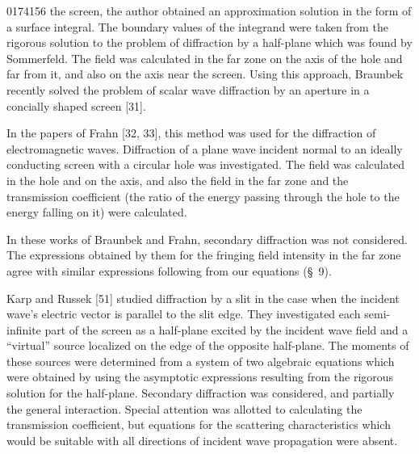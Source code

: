 \begin{scanpage}{0174}{156}
the screen, the author obtained an approximation solution in the form of a surface integral. The boundary values of the integrand were taken from the rigorous solution to the problem of diffraction by a half-plane which was found by Sommerfeld. The field was calculated in the far zone on the axis of the hole and far from it, and also on the axis near the screen. Using this approach, Braunbek recently solved the problem of scalar wave diffraction by an aperture in a concially shaped screen [31].

In the papers of Frahn [32, 33], this method was used for the diffraction of electromagnetic waves. Diffraction of a plane wave incident normal to an ideally conducting screen with a circular hole was investigated. The field was calculated in the hole and on the axis, and also the field in the far zone and the transmission coefficient (the ratio of the energy passing through the hole to the energy falling on it) were calculated.

In these works of Braunbek and Frahn, secondary diffraction was not considered. The expressions obtained by them for the fringing field intensity in the far zone agree with similar expressions following from our equations (\S~9).

Karp and Russek [51] studied diffraction by a slit in the case when the incident wave's electric vector is parallel to the slit edge. They investigated each semi-infinite part of the screen as a half-plane excited by the incident wave field and a ``virtual'' source localized on the edge of the opposite half-plane. The moments of these sources were determined from a system of two algebraic equations which were obtained by using the asymptotic expressions resulting from the rigorous solution for the half-plane. Secondary diffraction was considered, and partially the general interaction. Special attention was allotted to calculating the transmission coefficient, but equations for the scattering characteristics which would be suitable with all directions of incident wave propagation were absent.
\end{scanpage}
